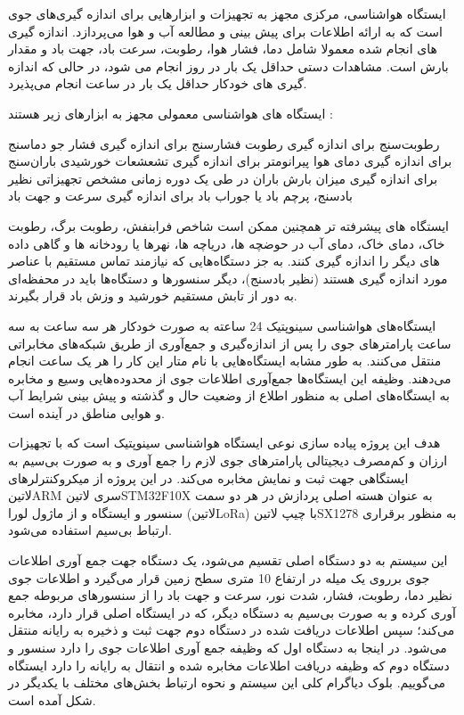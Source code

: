 ایستگاه هواشناسی، مرکزی مجهز به تجهیزات و ابزارهایی برای اندازه گیری‌های جوی است که به ارائه اطلاعات برای پیش بینی و مطالعه آب و هوا می‌پردازد. اندازه گیری های انجام شده معمولا شامل دما، فشار هوا، رطوبت، سرعت باد، جهت باد و مقدار بارش است. مشاهدات دستی حداقل یک بار در روز انجام می شود، در حالی که اندازه گیری های خودکار حداقل یک بار در ساعت انجام می‌پذیرد.

ایستگاه های هواشناسی معمولی مجهز به ابزارهای زیر هستند :

رطوبت‌سنج برای اندازه گیری رطوبت
فشارسنج برای اندازه گیری فشار جو
دماسنج برای اندازه گیری دمای هوا
پیرانومتر برای اندازه گیری تشعشعات خورشیدی
باران‌سنج برای اندازه گیری میزان بارش باران در طی یک دوره زمانی مشخص
تجهیزاتی نظیر بادسنج، پرچم باد یا جوراب باد برای اندازه گیری سرعت و جهت باد

ایستگاه های پیشرفته تر همچنین ممکن است شاخص فرابنفش، رطوبت برگ، رطوبت خاک، دمای خاک، دمای آب در حوضچه ها، دریاچه ها، نهرها یا رودخانه ها و گاهی داده های دیگر را اندازه گیری کنند. به جز دستگاه‌هایی که نیازمند تماس مستقیم با عناصر مورد اندازه گیری هستند (نظیر بادسنج)، دیگر سنسورها و دستگاه‌ها باید در محفظه‌ای به دور از تابش مستقیم خورشید و وزش باد قرار بگیرند.

ایستگاه‌های هواشناسی سینوپتیک 24 ساعته به صورت خودکار هر سه ساعت به سه ساعت پارامتر‌های جوی را پس از اندازه‌گیری و جمع‌آوری از طریق شبکه‌های مخابراتی منتقل می‌کنند. به طور مشابه ایستگاه‌هایی با نام متار این کار را هر  یک ساعت انجام‌ می‌دهند. وظیفه این ایستگاه‌ها جمع‌آوری اطلاعات جوی از محدوده‌هایی وسیع و مخابره به ایستگاه‌های اصلی به منظور اطلاع از وضعیت حال و گذشته و پیش بینی شرایط آب و هوایی مناطق در آینده است. 

هدف این پروژه پیاده سازی نوعی ایستگاه هواشناسی سینوپتیک است که با تجهیزات ارزان و کم‌مصرف دیجیتالی پارامتر‌های جوی لازم را جمع آوری و به صورت بی‌سیم به ایستگاهی جهت ثبت و نمایش مخابره می‌کند. در این پروژه از میکروکنترلرهای ‌لاتین{ARM} سری ‌لاتین{STM32F10X} به عنوان هسته اصلی پردازش در هر دو سمت سنسور و ایستگاه و از ماژول لورا (‌لاتین{LoRa}) با چیپ ‌لاتین{SX1278} به منظور برقراری ارتباط بی‌سیم استفاده می‌شود.


این سیستم به دو دستگاه اصلی تقسیم می‌شود، یک دستگاه جهت جمع آوری اطلاعات جوی برروی یک میله در ارتفاع 10 متری سطح زمین قرار می‌گیرد و اطلاعات جوی نظیر دما، رطوبت، فشار، شدت نور، سرعت و جهت باد را از سنسور‌های مربوطه جمع آوری کرده و به صورت بی‌سیم به دستگاه دیگر، که در ایستگاه اصلی قرار دارد، مخابره می‌کند؛ سپس اطلاعات دریافت شده در دستگاه دوم جهت ثبت و ذخیره به رایانه منتقل می‌شود. در اینجا به دستگاه اول که وظیفه جمع آوری اطلاعات جوی را دارد سنسور و دستگاه دوم که وظیفه دریافت اطلاعات مخابره شده و انتقال به رایانه را دارد ایستگاه می‌گوییم. بلوک دیاگرام کلی این سیستم و نحوه ارتباط بخش‌های مختلف با یکدیگر در شکل  آمده است.

